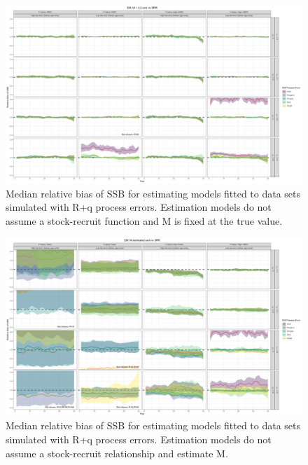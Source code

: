 \documentclass[
  12pt,
]{article}
\begin{document}
\begin{landscape}
\begin{figure}
\caption{Median relative bias of SSB for estimating models fitted to data sets simulated with R+q process errors.  Estimation models do not assume a stock-recruit function and M is fixed at the true value.}\label{q_om_em_R_MF_relbias_ssb}
\begin{center}
\includegraphics[width = \textwidth]{q_om_R_MF_relbias_ssb.png}
\end{center}
\end{figure}
\end{landscape}

\begin{landscape}
\begin{figure}
\caption{Median relative bias of SSB for estimating models fitted to data sets simulated with R+q process errors. Estimation models do not assume a stock-recruit relationship and estimate M.}\label{q_om_em_R_ME_relbias_ssb}
\begin{center}
\includegraphics[width = \textwidth]{q_om_R_ME_relbias_ssb.png}
\end{center}
\end{figure}
\end{landscape}
\end{document}
